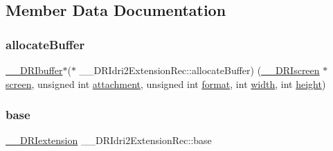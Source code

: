 \subsection{Member Data Documentation}
\mbox{\label{struct_____d_r_idri2_extension_rec_a454aa5adc5253e6f73ce687bf3f043e5}} 
\subsubsection{\texorpdfstring{allocate\+Buffer}{allocateBuffer}}
{\footnotesize\ttfamily \hyperlink{dri__interface_8h_a99ccb036a4865817ec4d06d153ba2446}{\+\_\+\+\_\+\+D\+R\+Ibuffer}$\ast$($\ast$ \+\_\+\+\_\+\+D\+R\+Idri2\+Extension\+Rec\+::allocate\+Buffer) (\hyperlink{dri__interface_8h_a9961b01d421ee1fd6ed3c05acc9ca561}{\+\_\+\+\_\+\+D\+R\+Iscreen} $\ast$\hyperlink{cad_8h_ae04e09e4e3831bfc1632c509ae37dcec}{screen}, unsigned int \hyperlink{glcorearb_8h_ad8f97111cc6514af5f352219d1cceb40}{attachment}, unsigned int \hyperlink{gl_8h_a71a65ffd977afe9c3fef116a5bc9ee27}{format}, int \hyperlink{gl_8h_a9a82cf3caff84cabc4598e2619faac17}{width}, int \hyperlink{gl_8h_aa352f2804b9902ac30769c00dde75d5f}{height})}

\mbox{\label{struct_____d_r_idri2_extension_rec_a71675244c4518f1cd35041acd4836135}} 
\subsubsection{\texorpdfstring{base}{base}}
{\footnotesize\ttfamily \hyperlink{dri__interface_8h_a4e0a61c8ece00d2b2c6792a9a1b55385}{\+\_\+\+\_\+\+D\+R\+Iextension} \+\_\+\+\_\+\+D\+R\+Idri2\+Extension\+Rec\+::base}

\mbox{\label{struct_____d_r_idri2_extension_rec_acfac8ddb8a1248baf2e5863ea7132f11}} 
